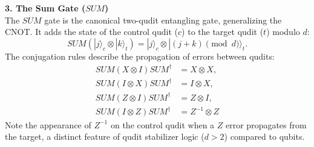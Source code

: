 \textbf{3. The Sum Gate ($SUM$)} \\
The $SUM$ gate is the canonical two-qudit entangling gate, generalizing the CNOT. It adds the state of the control qudit ($c$) to the target qudit ($t$) modulo $d$:
\begin{equation}
    SUM (|j\rangle_c \otimes |k\rangle_t)= |j\rangle_c \otimes |(j+k) \pmod d\rangle_t.
\end{equation}
The conjugation rules describe the propagation of errors between qudits:
\begin{align}
    SUM (X \otimes I) SUM^\dagger &= X \otimes X, \\
    SUM (I \otimes X) SUM^\dagger &= I \otimes X, \\
    SUM (Z \otimes I) SUM^\dagger &= Z \otimes I, \\
    SUM (I \otimes Z) SUM^\dagger &= Z^{-1} \otimes Z
\end{align}
Note the appearance of $Z^{-1}$ on the control qudit when a $Z$ error propagates from the target, a distinct feature of qudit stabilizer logic ($d>2$) compared to qubits.